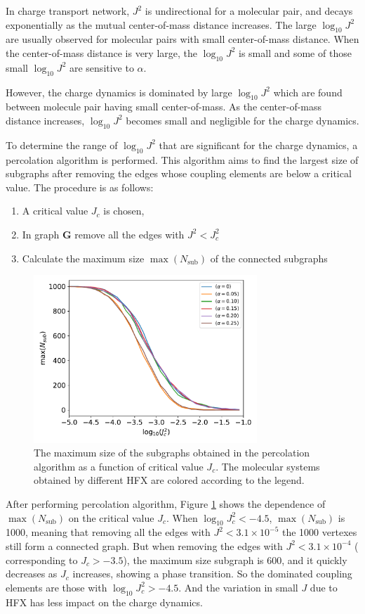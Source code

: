 \documentclass[letterpaper,12pt]{article}
\begin{document}
In charge transport network, $J^2$ is undirectional for a molecular pair, and decays exponentially as the mutual center-of-mass distance increases. The large $\log_{10} J^2$ are usually observed for molecular pairs with small center-of-mass distance. 
When the center-of-mass distance is very large, the $\log_{10} J^2$ is small and some of those small $\log_{10} J^2$ are sensitive to $\alpha$. 

However, the charge dynamics is dominated by large $\log_{10} J^2$ which are found between molecule pair having small center-of-mass. As the center-of-mass distance increases, $\log_{10} J^2$ becomes small and negligible for the charge dynamics.

To determine the range of $\log_{10} J^2$ that are significant for the charge dynamics, a percolation algorithm is performed. This algorithm aims to find the largest size of subgraphs after removing the edges whose coupling elements are below a critical value. The procedure is as follows:
\begin{enumerate}
    \item A critical value $J_c$ is chosen,
    \item In graph $\mathbf{G}$ remove all the edges with $J^2 < J_c^2$
    \item Calculate the maximum size $\max({N_\text{sub}})$ of the connected subgraphs
\end{enumerate}

\begin{figure}[H]
    \centering
    \includegraphics[width=0.75\textwidth]{figs/fig_network_all.pdf}
    \caption{The maximum size of the subgraphs obtained in the percolation algorithm as a function of critical value $J_c$. The molecular systems obtained by different HFX are colored according to the legend.}
    \label{fig:J_percolate}
\end{figure}
After performing percolation algorithm, Figure \ref{fig:J_percolate} shows the dependence of $\max({N_\text{sub}})$ on the critical value $J_c$. When $\log_{10} J_c^2 < -4.5$, $\max({N_\text{sub}})$ is 1000, meaning that removing all the edges with $J^2 < 3.1 \times 10^{-5}$ the 1000 vertexes still form a connected graph. 
But when removing the edges with $J^2 < 3.1 \times 10^{-4}$ ( corresponding to $J_c > -3.5$), the maximum size subgraph is 600, and it quickly decreases as $J_c$ increases, showing a phase transition. 
So the dominated coupling elements are those with $\log_{10} J_c^2 > -4.5$. 
And the variation in small $J$ due to HFX has less impact on the charge dynamics. 
\end{document}
